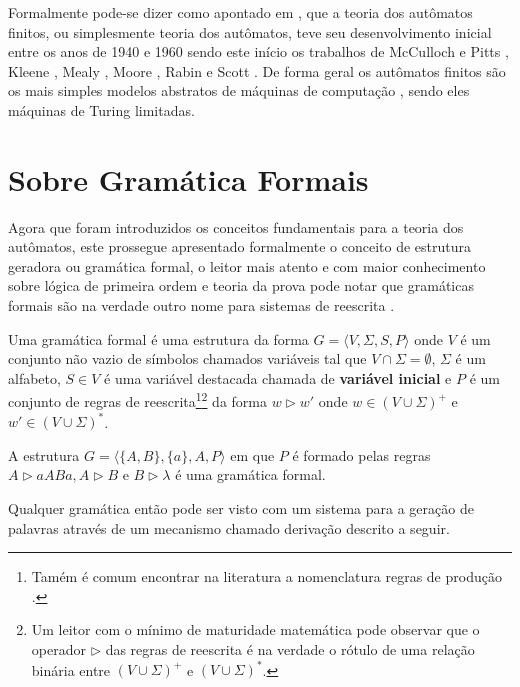 Formalmente pode-se dizer como apontado em \cite{valdi2020phd}, que a teoria dos autômatos finitos, ou simplesmente teoria dos autômatos, teve seu desenvolvimento inicial entre os anos de 1940 e 1960 sendo este início os trabalhos de McCulloch e Pitts \cite{mcculloch1943}, Kleene \cite{kleene1951}, Mealy \cite{mealy1955}, Moore \cite{moore1956}, Rabin e Scott \cite{rabin1963, rabin1959}. De forma geral os autômatos finitos são os mais simples modelos abstratos de máquinas de computação \cite{farias2017}, sendo eles máquinas de Turing limitadas. 

\section{Sobre Gramática Formais}\label{sec:GramaticaFormal}

Agora que foram introduzidos os conceitos fundamentais para a teoria dos autômatos, este prossegue apresentado formalmente o conceito de estrutura geradora ou gramática formal, o leitor mais atento e com maior conhecimento sobre lógica de primeira ordem e teoria da prova \cite{avigad1998, buss1998} pode notar que gramáticas formais são na verdade outro nome para  sistemas de reescrita \cite{ayala2014}.

\begin{definition}\label{def:GramaticaFormal}
	Uma gramática formal é uma estrutura da forma $G = \langle V, \Sigma, S, P \rangle$ onde $V$ é um conjunto não vazio de símbolos chamados variáveis tal que $V \cap \Sigma = \emptyset$, $\Sigma$ é um alfabeto, $S \in V$ é uma variável destacada chamada de \textbf{variável inicial} e $P$ é um conjunto de regras de reescrita\footnote{Tamém é comum encontrar na literatura a nomenclatura regras de produção \cite{benjaLivro2010, linz2006}.}\footnote{Um leitor com o mínimo de maturidade matemática pode observar que o operador $\rhd$ das regras de reescrita é na verdade o rótulo de uma relação binária entre $(V \cup \Sigma)^+$ e $(V \cup \Sigma)^*$.} da forma $w \rhd w'$ onde $w \in (V \cup \Sigma)^+$ e $w' \in (V \cup \Sigma)^*$.
\end{definition}

\begin{example}\label{exe:GramaticaFormal1} 
	A estrutura $G = \langle \{A, B\}, \{a\}, A, P \rangle$ em que $P$ é formado pelas regras $A \rhd aABa, A \rhd B$ e $B \rhd \lambda$ é uma gramática formal.
\end{example}

Qualquer gramática então pode ser visto com um sistema para a geração de palavras através de um mecanismo chamado derivação descrito a seguir.

